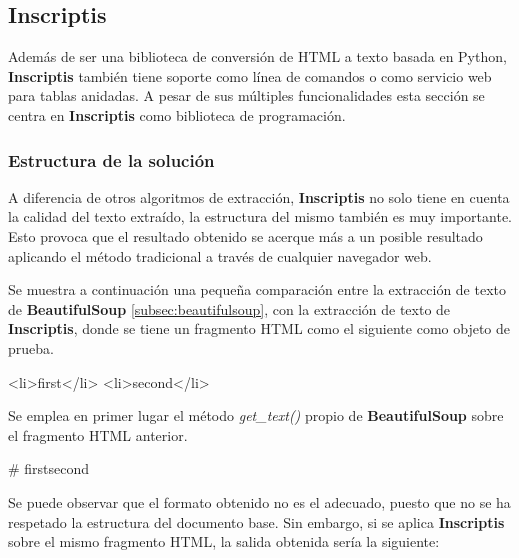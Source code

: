 \subsection{Inscriptis}
\label{subsec:inscriptis}

Además de ser una biblioteca de conversión de HTML a texto basada en Python, \textbf{Inscriptis} 
\cite{inscriptis} también tiene soporte como línea de comandos o como servicio web para tablas anidadas. 
A pesar de sus múltiples funcionalidades esta sección se centra en \textbf{Inscriptis} como biblioteca de 
programación.

\subsubsection{Estructura de la solución}
\label{subsubsec:estructura de la solucion}

A diferencia de otros algoritmos de extracción, \textbf{Inscriptis} no solo tiene en cuenta la calidad del 
texto extraído, la estructura del mismo también es muy importante. Esto provoca que el resultado obtenido 
se acerque más a un posible resultado aplicando el método tradicional a través de cualquier navegador web.

Se muestra a continuación una pequeña comparación entre la extracción de texto de \textbf{BeautifulSoup}
\ref{subsec:beautifulsoup}, con la extracción de texto de \textbf{Inscriptis}, donde se tiene un fragmento 
HTML como el siguiente como objeto de prueba.

\begin{Schunk}
  \begin{Soutput}
      <li>first</li>
      <li>second</li>
  \end{Soutput}
\end{Schunk}

Se emplea en primer lugar el método \emph{get\_text()} propio de \textbf{BeautifulSoup} sobre el fragmento 
HTML anterior.

\begin{Schunk}
  \begin{Soutput}
    # firstsecond
  \end{Soutput}
\end{Schunk}

Se puede observar que el formato obtenido no es el adecuado, puesto que no se ha respetado la estructura
del documento base. Sin embargo, si se aplica \textbf{Inscriptis} sobre el mismo fragmento HTML, la salida 
obtenida sería la siguiente:

